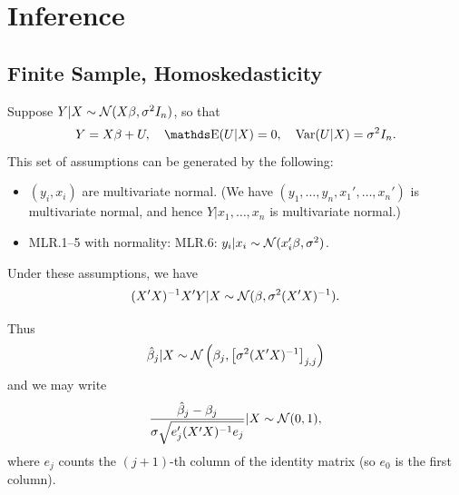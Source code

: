 \documentclass[letterpaper, 10pt]{article}
\begin{document}




\section{Inference}
\subsection{Finite Sample, Homoskedasticity}
Suppose \(Y | X \sim \mathcal{N}(X \beta, \sigma^2 I_n)\), so that
\[
  Y = X \beta + U, \quad
  \E(U|X) = 0, \quad
  \Var(U|X) = \sigma^2 I_n.
\]
This set of assumptions can be generated by the following:
\begin{itemize}
  \item \((y_i, x_i)\) are multivariate normal.
    (We have \((y_1, \dots, y_n, x_1', \dots, x_n')\) is multivariate normal, and hence \(Y| x_1, \dots, x_n\) is multivariate normal.)
  \item MLR.1--5 with normality: MLR.6:  \(y_i | x_i \sim \mathcal{N}(x_i' \beta, \sigma^2)\).
\end{itemize}
Under these assumptions, we have
\[
  (X' X)^{-1} X' Y | X \sim \mathcal{N}(\beta, \sigma^2 (X' X)^{-1}).
\]

Thus
\[
  \hat{\beta}_j | X \sim \mathcal{N}\left( \beta_j, \left[ \sigma^2 (X' X)^{-1} \right]_{j, j} \right)
\]
and we may write
\[
  \frac{\hat{\beta}_j - \beta_j}{\sigma \sqrt{e_j' (X' X)^{-1} e_j}} | X
  \sim \mathcal{N}(0, 1),
\]
where \(e_j\) counts the \((j + 1)\)-th column of the identity matrix (so \(e_0\) is the first column).
\end{document}
